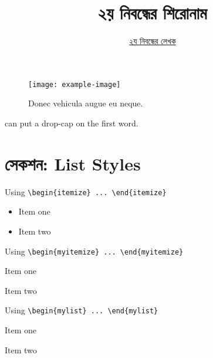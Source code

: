 \documentclass[12pt]{article}
\begin{document}

\title{২য় নিবন্ধের শিরোনাম}
\author{\href{https://github.com/rafisics/ebook-template}{২য় নিবন্ধের লেখক}}
\date{}


\begin{figure}[hbt!]
        \centering
        \texttt{[image: example-image]}
        \caption{Donec vehicula augue eu neque.}
\end{figure}

 can put a drop-cap on the first word. \blindtext \\

\section*{সেকশন: List Styles}

Using \verb|\begin{itemize} ... \end{itemize}|
\begin{itemize}
        \item Item one
        \item Item two
\end{itemize}

Using \verb|\begin{myitemize} ... \end{myitemize}|
\begin{myitemize}
        \item Item one
        \item Item two
\end{myitemize}

Using \verb|\begin{mylist} ... \end{mylist}|
\begin{mylist}
        \item Item one
        \item Item two
\end{mylist}
\end{document}
